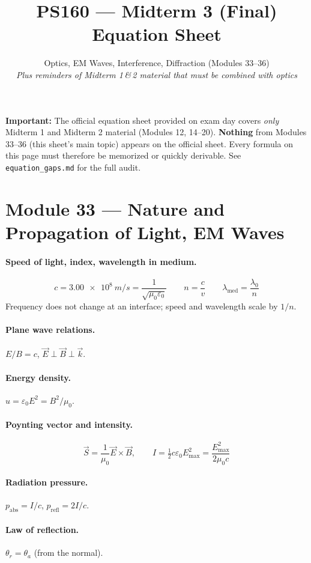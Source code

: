 \documentclass[11pt]{article}
\title{PS160 --- Midterm 3 (Final) Equation Sheet}
\author{Optics, EM Waves, Interference, Diffraction (Modules 33--36) \\
\textit{Plus reminders of Midterm 1\,\&\,2 material that must be combined with optics}}
\date{}
\begin{document}
\maketitle

\noindent\textbf{Important:} The official equation sheet provided on exam day
covers \emph{only} Midterm 1 and Midterm 2 material (Modules 12, 14--20).
\textbf{Nothing} from Modules 33--36 (this sheet's main topic) appears on the
official sheet. Every formula on this page must therefore be memorized or
quickly derivable. See \texttt{equation\_gaps.md} for the full audit.

\section*{Module 33 --- Nature and Propagation of Light, EM Waves}

\paragraph{Speed of light, index, wavelength in medium.}
\[
c = \SI{3.00e8}{m/s} = \frac{1}{\sqrt{\mu_0\varepsilon_0}}
\qquad
n = \frac{c}{v}
\qquad
\lambda_{\text{med}} = \frac{\lambda_0}{n}
\]
Frequency does not change at an interface; speed and wavelength scale by $1/n$.

\paragraph{Plane wave relations.} $E/B = c$, $\vec E\perp\vec B\perp\vec k$.

\paragraph{Energy density.} $u = \varepsilon_0 E^2 = B^2/\mu_0$.

\paragraph{Poynting vector and intensity.}
\[
\vec S = \frac{1}{\mu_0}\vec E\times\vec B,
\qquad
I = \tfrac{1}{2}c\varepsilon_0 E_{\max}^2 = \frac{E_{\max}^2}{2\mu_0 c}
\]

\paragraph{Radiation pressure.} $p_{\text{abs}} = I/c$, $p_{\text{refl}} = 2I/c$.

\paragraph{Law of reflection.} $\theta_r = \theta_a$ (from the normal).
\end{document}
